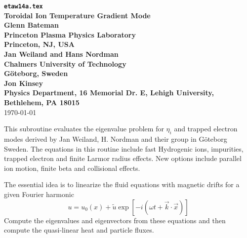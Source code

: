 
\headheight 0pt \headsep 0pt          
\topmargin 0pt  \textheight 9.0in
\oddsidemargin 0pt \textwidth 6.5in

\newcommand{\Partial}[2]{\frac{\partial #1}{\partial #2}}
\newcommand{\jacobian}{{\cal J}}



\begin{center} 
{\bf {\tt etaw14a.tex} \\
Toroidal Ion Temperature Gradient Mode \\
\vspace{1pc}
Glenn Bateman \\
Princeton Plasma Physics Laboratory \\
Princeton, NJ, USA \\
\vspace{1pc}
Jan Weiland and Hans Nordman \\
Chalmers University of Technology \\
G\"{o}teborg, Sweden \\
\vspace{1pc}
Jon Kinsey \\
Physics Department, 16 Memorial Dr. E, Lehigh University, 
Bethlehem, PA 18015} \\ 
\vspace{1pc}
\today
\end{center}
This subroutine evaluates the eigenvalue problem for $\eta_i$
and trapped electron modes derived by 
Jan Weiland, H. Nordman and their group in G\"{o}teborg Sweden.
The equations in this routine include fast Hydrogenic ions,
impurities, trapped electron and finite Larmor radius effects.
New options include parallel ion motion, 
finite beta and collisional effects.

The essential idea is to linearize the fluid equations 
with magnetic drifts for a given Fourier harmonic
\[ u = u_0(x) + \tilde{u} \exp\left[ -i (\omega t + \vec{k} \cdot \vec{x} ) \right] \]
Compute the eigenvalues and eigenvectors from these equations and then
compute the quasi-linear heat and particle fluxes.


